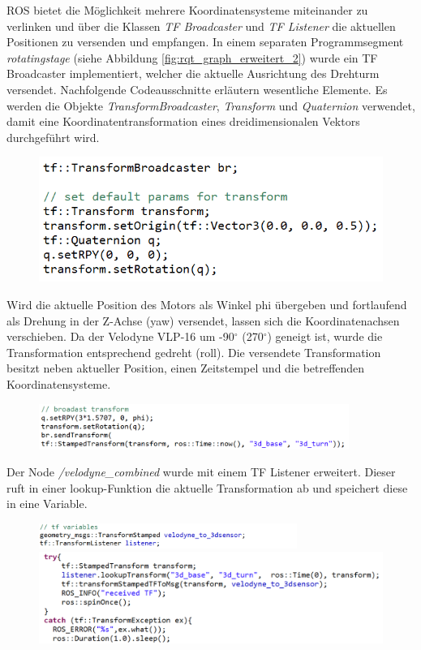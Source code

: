 ROS bietet die Möglichkeit mehrere Koordinatensysteme miteinander zu verlinken und über die Klassen \textit{TF Broadcaster} und \textit{TF Listener} die aktuellen Positionen zu versenden und empfangen. \cite{tf} In einem separaten Programmsegment \textit{rotatingstage} (siehe Abbildung \ref{fig:rqt_graph_erweitert_2}) wurde ein TF Broadcaster implementiert, welcher die aktuelle Ausrichtung des Drehturm versendet. Nachfolgende Codeausschnitte erläutern wesentliche Elemente. Es werden die Objekte \textit{TransformBroadcaster}, \textit{Transform} und \textit{Quaternion} verwendet, damit eine Koordinatentransformation eines dreidimensionalen Vektors durchgeführt wird.
\begin{figure}[H]
	\includegraphics[width=0.\textwidth]{resources/sourcecode/tf_broadcaster.png}	
\end{figure} 
Wird die aktuelle Position des Motors als Winkel phi übergeben und fortlaufend als Drehung in der Z-Achse (yaw) versendet, lassen sich die Koordinatenachsen verschieben. Da der Velodyne VLP-16 um -90$^\circ$ (270$^\circ$) geneigt ist, wurde die Transformation entsprechend gedreht (roll). Die versendete Transformation besitzt neben aktueller Position, einen Zeitstempel und die betreffenden Koordinatensysteme.
\begin{figure}[H]
	\includegraphics[width=0.9\textwidth]{resources/sourcecode/setrotation.png}	
\end{figure}
Der Node \textit{/velodyne\_combined} wurde mit einem TF Listener erweitert. Dieser ruft in einer lookup-Funktion die aktuelle Transformation ab und speichert diese in eine Variable.
\begin{figure}[H]
	\includegraphics[width=0.75\textwidth]{resources/sourcecode/tf_listener.png}
	\includegraphics[width=1.0\textwidth]{resources/sourcecode/tf_update.png}		

\end{figure}

